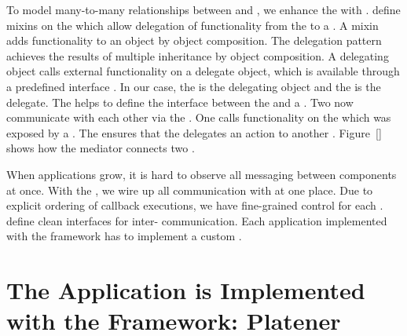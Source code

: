 \documentclass[../ClassicThesis.tex]{subfiles}
\begin{document}
To model many-to-many relationships between  and
, we enhance the  with
.  define mixins on the
 which allow delegation of functionality from the
 to a . A mixin adds functionality to
an object by object composition\cite{}. The delegation pattern achieves the results of multiple
inheritance by object composition. A delegating object calls external
functionality on a delegate object, which is available through a
predefined interface \cite{delegation}. In
our case, the  is the delegating object and the
 is the delegate. The  helps to define
the interface between the  and a . Two
 now communicate with each other via the
. One  calls functionality on the
 which was exposed by a . The
 ensures that the  delegates an
action to another . Figure~\ref{} shows how the mediator connects two .

When applications grow, it is hard to observe all messaging between
components at once. With the , we wire up all
communication with  at one place. Due to explicit
ordering of callback executions, we have fine-grained control for each
.  define clean interfaces for
inter- communication. Each application implemented with
the {\convertify} framework has to implement a custom .


\section{The Application is Implemented with the Framework: Platener}
\label{sec:application-platener}

\end{document}
